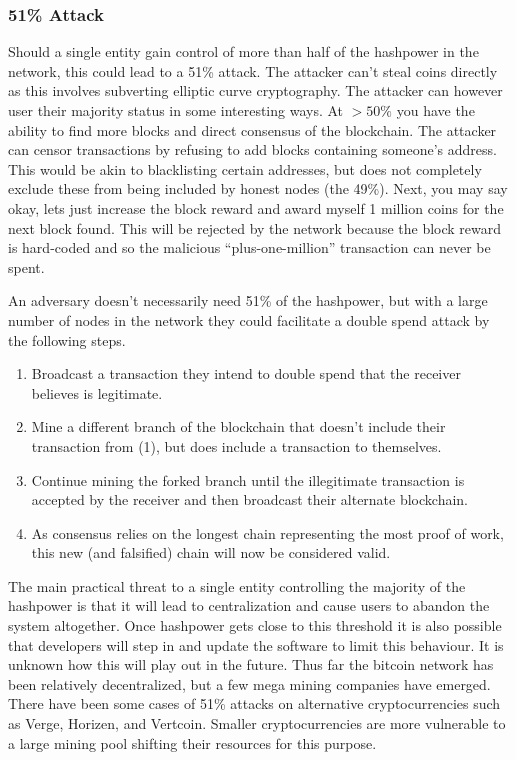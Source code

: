 \subsubsection*{51\% Attack}\label{Se:51}
Should a single entity gain control of more than half of the hashpower in the network, this could lead to a 51\% attack. The attacker can't steal coins directly as this involves subverting elliptic curve cryptography. The attacker can however user their majority status in some interesting ways. At $>50\%$ you have the ability to find more blocks and direct consensus of the blockchain. The attacker can censor transactions by refusing to add blocks containing someone's address. This would be akin to blacklisting certain addresses, but does not completely exclude these from being included by honest nodes (the 49\%). Next, you may say okay, lets just increase the block reward and award myself 1 million coins for the next block found. This will be rejected by the network because the block reward is hard-coded and so the malicious ``plus-one-million'' transaction can never be spent. 

An adversary doesn't necessarily need 51\% of the hashpower, but with a large number of nodes in the network they could facilitate a double spend attack by the following steps.
\begin{enumerate}
	\item Broadcast a transaction they intend to double spend that the receiver believes is legitimate.
	\item Mine a different branch of the blockchain that doesn't include their transaction from (1), but does include a transaction to themselves.
	\item Continue mining the forked branch until the illegitimate transaction is accepted by the receiver and then broadcast their alternate blockchain.
	\item As consensus relies on the longest chain representing the most proof of work, this new (and falsified) chain will now be considered valid.
\end{enumerate}

The main practical threat to a single entity controlling the majority of the hashpower is that it will lead to centralization and cause users to abandon the system altogether. Once hashpower gets close to this threshold it is also possible that developers will step in and update the software to limit this behaviour. It is unknown how this will play out in the future. Thus far the bitcoin network has been relatively decentralized, but a few mega mining companies have emerged. There have been some cases of 51\% attacks on alternative cryptocurrencies such as Verge, Horizen, and Vertcoin. Smaller cryptocurrencies are more vulnerable to a large mining pool shifting their resources for this purpose.

